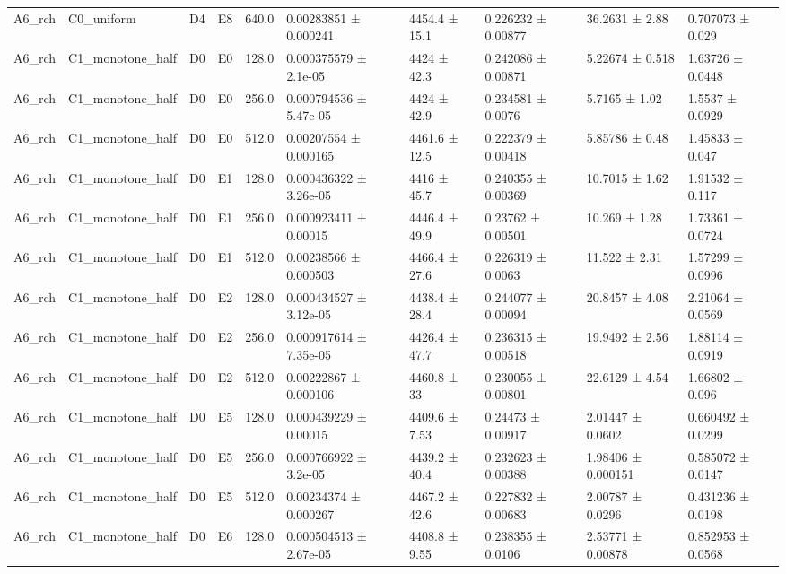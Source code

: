 \begin{table}
\begin{tabular}{llllllllll}
A6\_rch & C0\_uniform & D4 & E8 & 640.0 & 0.00283851 ± 0.000241 & 4454.4 ± 15.1 & 0.226232 ± 0.00877 & 36.2631 ± 2.88 & 0.707073 ± 0.029 \\
A6\_rch & C1\_monotone\_half & D0 & E0 & 128.0 & 0.000375579 ± 2.1e-05 & 4424 ± 42.3 & 0.242086 ± 0.00871 & 5.22674 ± 0.518 & 1.63726 ± 0.0448 \\
A6\_rch & C1\_monotone\_half & D0 & E0 & 256.0 & 0.000794536 ± 5.47e-05 & 4424 ± 42.9 & 0.234581 ± 0.0076 & 5.7165 ± 1.02 & 1.5537 ± 0.0929 \\
A6\_rch & C1\_monotone\_half & D0 & E0 & 512.0 & 0.00207554 ± 0.000165 & 4461.6 ± 12.5 & 0.222379 ± 0.00418 & 5.85786 ± 0.48 & 1.45833 ± 0.047 \\
A6\_rch & C1\_monotone\_half & D0 & E1 & 128.0 & 0.000436322 ± 3.26e-05 & 4416 ± 45.7 & 0.240355 ± 0.00369 & 10.7015 ± 1.62 & 1.91532 ± 0.117 \\
A6\_rch & C1\_monotone\_half & D0 & E1 & 256.0 & 0.000923411 ± 0.00015 & 4446.4 ± 49.9 & 0.23762 ± 0.00501 & 10.269 ± 1.28 & 1.73361 ± 0.0724 \\
A6\_rch & C1\_monotone\_half & D0 & E1 & 512.0 & 0.00238566 ± 0.000503 & 4466.4 ± 27.6 & 0.226319 ± 0.0063 & 11.522 ± 2.31 & 1.57299 ± 0.0996 \\
A6\_rch & C1\_monotone\_half & D0 & E2 & 128.0 & 0.000434527 ± 3.12e-05 & 4438.4 ± 28.4 & 0.244077 ± 0.00094 & 20.8457 ± 4.08 & 2.21064 ± 0.0569 \\
A6\_rch & C1\_monotone\_half & D0 & E2 & 256.0 & 0.000917614 ± 7.35e-05 & 4426.4 ± 47.7 & 0.236315 ± 0.00518 & 19.9492 ± 2.56 & 1.88114 ± 0.0919 \\
A6\_rch & C1\_monotone\_half & D0 & E2 & 512.0 & 0.00222867 ± 0.000106 & 4460.8 ± 33 & 0.230055 ± 0.00801 & 22.6129 ± 4.54 & 1.66802 ± 0.096 \\
A6\_rch & C1\_monotone\_half & D0 & E5 & 128.0 & 0.000439229 ± 0.00015 & 4409.6 ± 7.53 & 0.24473 ± 0.00917 & 2.01447 ± 0.0602 & 0.660492 ± 0.0299 \\
A6\_rch & C1\_monotone\_half & D0 & E5 & 256.0 & 0.000766922 ± 3.2e-05 & 4439.2 ± 40.4 & 0.232623 ± 0.00388 & 1.98406 ± 0.000151 & 0.585072 ± 0.0147 \\
A6\_rch & C1\_monotone\_half & D0 & E5 & 512.0 & 0.00234374 ± 0.000267 & 4467.2 ± 42.6 & 0.227832 ± 0.00683 & 2.00787 ± 0.0296 & 0.431236 ± 0.0198 \\
A6\_rch & C1\_monotone\_half & D0 & E6 & 128.0 & 0.000504513 ± 2.67e-05 & 4408.8 ± 9.55 & 0.238355 ± 0.0106 & 2.53771 ± 0.00878 & 0.852953 ± 0.0568 \\

\end{tabular}
\end{table}
